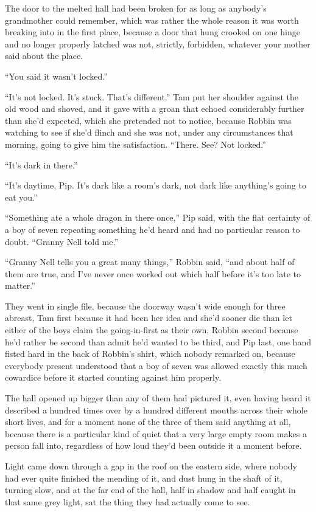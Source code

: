 The door to the melted hall had been broken for as long as anybody’s grandmother could remember, which was rather the whole reason it was worth breaking into in the first place, because a door that hung crooked on one hinge and no longer properly latched was not, strictly, forbidden, whatever your mother said about the place.

“You said it wasn’t locked.”

“It’s not locked. It’s stuck. That’s different.” Tam put her shoulder against the old wood and shoved, and it gave with a groan that echoed considerably further than she’d expected, which she pretended not to notice, because Robbin was watching to see if she’d flinch and she was not, under any circumstances that morning, going to give him the satisfaction. “There. See? Not locked.”

“It’s dark in there.”

“It’s daytime, Pip. It’s dark like a room’s dark, not dark like anything’s going to eat you.”

“Something ate a whole dragon in there once,” Pip said, with the flat certainty of a boy of seven repeating something he’d heard and had no particular reason to doubt. “Granny Nell told me.”

“Granny Nell tells you a great many things,” Robbin said, “and about half of them are true, and I’ve never once worked out which half before it’s too late to matter.”

\sceneBreak

They went in single file, because the doorway wasn’t wide enough for three abreast, Tam first because it had been her idea and she’d sooner die than let either of the boys claim the going-in-first as their own, Robbin second because he’d rather be second than admit he’d wanted to be third, and Pip last, one hand fisted hard in the back of Robbin’s shirt, which nobody remarked on, because everybody present understood that a boy of seven was allowed exactly this much cowardice before it started counting against him properly.

The hall opened up bigger than any of them had pictured it, even having heard it described a hundred times over by a hundred different mouths across their whole short lives, and for a moment none of the three of them said anything at all, because there is a particular kind of quiet that a very large empty room makes a person fall into, regardless of how loud they’d been outside it a moment before.

Light came down through a gap in the roof on the eastern side, where nobody had ever quite finished the mending of it, and dust hung in the shaft of it, turning slow, and at the far end of the hall, half in shadow and half caught in that same grey light, sat the thing they had actually come to see.

